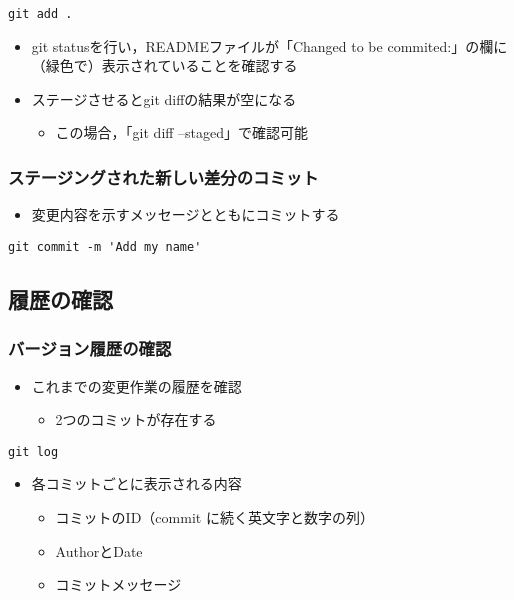 \documentclass[a4paper,twoside,twocolumn]{bxjsarticle}
\begin{document}
\begin{verbatim}
git add .
\end{verbatim}

\begin{itemize}
\item git statusを行い，READMEファイルが「Changed to be commited:」の欄に
（緑色で）表示されていることを確認する
\item ステージさせるとgit diffの結果が空になる
\begin{itemize}
\item この場合，「git diff --staged」で確認可能
\end{itemize}
\end{itemize}

\subsubsection{ステージングされた新しい差分のコミット}
\label{sec-1-4-5}
\begin{itemize}
\item 変更内容を示すメッセージとともにコミットする
\end{itemize}

\begin{verbatim}
git commit -m 'Add my name'
\end{verbatim}

\subsection{履歴の確認}
\label{sec-1-5}
\subsubsection{バージョン履歴の確認}
\label{sec-1-5-1}
\begin{itemize}
\item これまでの変更作業の履歴を確認
\begin{itemize}
\item 2つのコミットが存在する
\end{itemize}
\end{itemize}

\begin{verbatim}
git log
\end{verbatim}

\begin{itemize}
\item 各コミットごとに表示される内容
\begin{itemize}
\item コミットのID（commit に続く英文字と数字の列）
\item AuthorとDate
\item コミットメッセージ
\end{itemize}
\end{itemize}
\end{document}
